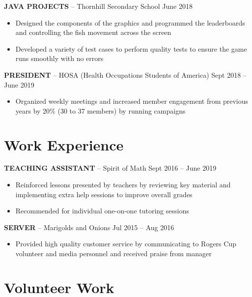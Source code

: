 \documentclass[11pt, a4paper]{awesome-cv}
\providecommand{\tightlist}{%
	\setlength{\itemsep}{0pt}\setlength{\parskip}{0pt}}
\begin{document}
\textbf{JAVA PROJECTS} -- Thornhill Secondary School June 2018

\begin{itemize}
\tightlist
\item
  Designed the components of the graphics and programmed the leaderboards and controlling the fish movement across the screen
\item
  Developed a variety of test cases to perform quality tests to ensure the game runs smoothly with no errors
\end{itemize}

\textbf{PRESIDENT} -- HOSA (Health Occupations Students of America) Sept 2018 -- June 2019

\begin{itemize}
\tightlist
\item
  Organized weekly meetings and increased member engagement from previous years by 20\% (30 to 37 members) by running campaigns
\end{itemize}

\hypertarget{work-experience}{%
\section{Work Experience}\label{work-experience}}

\textbf{TEACHING ASSISTANT} -- Spirit of Math Sept 2016 -- June 2019

\begin{itemize}
\tightlist
\item
  Reinforced lessons presented by teachers by reviewing key material and implementing extra help sessions to improve overall grades
\item
  Recommended for individual one-on-one tutoring sessions
\end{itemize}

\textbf{SERVER} -- Marigolds and Onions Jul 2015 -- Aug 2016

\begin{itemize}
\tightlist
\item
  Provided high quality customer service by communicating to Rogers Cup volunteer and media personnel and received praise from manager
\end{itemize}

\hypertarget{volunteer-work}{%
\section{Volunteer Work}\label{volunteer-work}}
\end{document}
